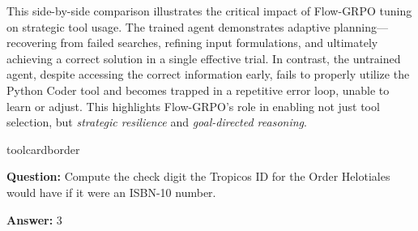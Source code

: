 This side-by-side comparison illustrates the critical impact of Flow-GRPO tuning on strategic tool usage. The trained \model agent demonstrates adaptive planning—recovering from failed searches, refining input formulations, and ultimately achieving a correct solution in a single effective trial. In contrast, the untrained agent, despite accessing the correct information early, fails to properly utilize the {Python Coder} tool and becomes trapped in a repetitive error loop, unable to learn or adjust. This highlights Flow-GRPO’s role in enabling not just tool selection, but \textit{strategic resilience} and \textit{goal-directed reasoning}.
\begin{custombox}[title=Example from \# GAIA]{toolcardborder}

\textbf{Question:} Compute the check digit the Tropicos ID for the Order Helotiales would have if it were an ISBN-10 number.

\vspace{1em}

\textbf{Answer:}  3
\end{custombox}

